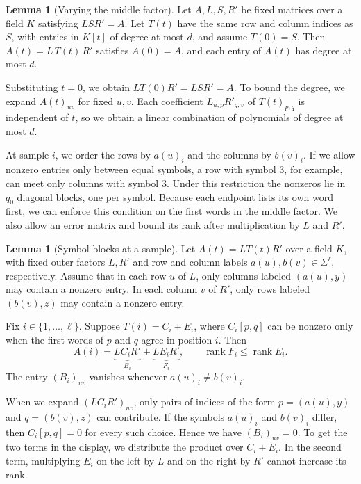 \documentclass{article}
\theoremstyle{definition}
\newtheorem{lemma}[theorem]{Lemma}
\DeclareMathOperator{\rank}{rank}
\begin{document}
\begin{lemma}[Varying the middle factor]\label{lem:middle-factor}
Let \(A,L,S,R'\) be fixed matrices over a field \(K\) satisfying \(LSR'=A\).
Let \(T(t)\) have the same row and column indices as \(S\), with entries
in \(K[t]\) of degree at most \(d\), and assume \(T(0)=S\). Then
\(A(t)=L\,T(t)\,R'\) satisfies \(A(0)=A\), and each entry of \(A(t)\)
has degree at most \(d\).
\end{lemma}

Substituting \(t=0\), we obtain \(LT(0)R'=LSR'=A\). To bound the
degree, we expand \(A(t)_{uv}\) for fixed \(u,v\). Each coefficient
\(L_{u,p}R'_{q,v}\) of \(T(t)_{p,q}\) is independent of \(t\), so
we obtain a linear combination of polynomials of degree at most \(d\).

At sample \(i\), we order the rows by \(a(u)_i\) and the columns by
\(b(v)_i\). If we allow nonzero entries only between equal symbols,
a row with symbol \(3\), for example, can meet only columns with symbol
\(3\). Under this restriction the nonzeros lie in \(q_0\) diagonal
blocks, one per symbol. Because each endpoint lists its own
word first, we can enforce this condition on the first words in the
middle factor. We also allow an error matrix and bound its rank after
multiplication by \(L\) and \(R'\).

\begin{lemma}[Symbol blocks at a sample]\label{cor:sample-blocks}
Let \(A(t)=LT(t)R'\) over a field \(K\), with fixed outer factors \(L,R'\)
and row and column labels \(a(u),b(v)\in\Sigma^\ell\), respectively.
Assume that in each row \(u\) of \(L\), only columns labeled \((a(u),y)\)
may contain a nonzero entry. In each column \(v\) of \(R'\), only rows
labeled \((b(v),z)\) may contain a nonzero entry.

Fix \(i\in\{1,\ldots,\ell\}\). Suppose \(T(i)=C_i+E_i\), where
\(C_i[p,q]\) can be nonzero only when the first words of \(p\) and \(q\)
agree in position \(i\). Then
\[
    A(i)=\underbrace{LC_iR'}_{B_i}+\underbrace{LE_iR'}_{F_i},
    \qquad \rank F_i\le \rank E_i .
\]
The entry \((B_i)_{uv}\) vanishes whenever \(a(u)_i\ne b(v)_i\).
\end{lemma}

When we expand \((LC_iR')_{uv}\), only pairs of indices of the form \(p=(a(u),y)\) and \(q=(b(v),z)\) can contribute. If the symbols
\(a(u)_i\) and \(b(v)_i\) differ, then \(C_i[p,q]=0\) for every such
choice. Hence we have \((B_i)_{uv}=0\). To get the two terms in the display,
we distribute the product over \(C_i+E_i\). In the second term,
multiplying \(E_i\) on the left by \(L\) and on the right by \(R'\)
cannot increase its rank.
\end{document}
